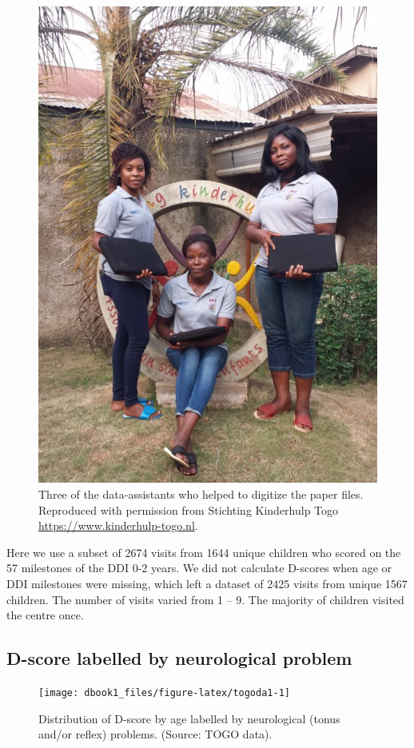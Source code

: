 \documentclass[
]{book}
\begin{document}
\begin{figure}

{\centering \includegraphics[width=0.6\linewidth]{fig/data_assistents} 

}

\caption{Three of the data-assistants who helped to digitize the paper files. Reproduced with permission from Stichting Kinderhulp Togo \url{https://www.kinderhulp-togo.nl}.}\label{fig:dataassistents}
\end{figure}



Here we use a subset of 2674 visits from 1644 unique children who scored on the 57 milestones of the DDI 0-2 years. We did not calculate D-scores when age or DDI milestones were missing, which left a dataset of 2425 visits from unique 1567 children. The number of visits varied from 1 -- 9. The majority of children visited the centre once.

\hypertarget{sec:togoneuro}{%
\subsection{D-score labelled by neurological problem}\label{sec:togoneuro}}

\begin{figure}

{\centering \texttt{[image: dbook1\_files/figure-latex/togoda1-1]} 

}

\caption{Distribution of D-score by age labelled by neurological (tonus and/or reflex) problems. (Source: TOGO data).}\label{fig:togoda1}
\end{figure}
\end{document}
